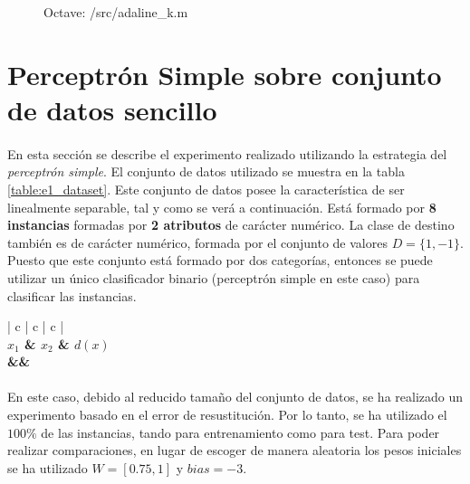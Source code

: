 \documentclass{article}
\begin{document}
			\begin{figure}[h]
				\centering
				\inputminted{octave}{./code/adaline_k.m}
				\caption{Octave: /src/adaline\_k.m}
				\label{code:adaline}
			\end{figure}


	\section{Perceptrón Simple sobre conjunto de datos sencillo}
	\label{sec:e1}

		\paragraph{}
		En esta sección se describe el experimento realizado utilizando la estrategia del \emph{perceptrón simple}. El conjunto de datos utilizado se muestra en la tabla \ref{table:e1_dataset}. Este conjunto de datos posee la característica de ser linealmente separable, tal y como se verá a continuación. Está formado por \textbf{8 instancias} formadas por \textbf{2 atributos} de carácter numérico. La clase de destino también es de carácter numérico, formada por el conjunto de valores $D = \{1,-1\}$. Puesto que este conjunto está formado por dos categorías, entonces se puede utilizar un único clasificador binario (perceptrón simple en este caso) para clasificar las instancias.

		\begin{table}[H]
			\centering
			\begin{tabu}{ | c | c | c |}
				\hline
				 \\ \hline
				\bfseries $x_1$ & \bfseries $x_2$ & \bfseries $d(x)$
				{\\\hline\one&\two&\three}
				\\\hline
			\end{tabu}
			\caption{Conjunto de datos Simple}
			\label{table:e1_dataset}
		\end{table}

		\paragraph{}
		En este caso, debido al reducido tamaño del conjunto de datos, se ha realizado un experimento basado en el error de resustitución. Por lo tanto, se ha utilizado el $100\%$ de las instancias, tando para entrenamiento como para test. Para poder realizar comparaciones, en lugar de escoger de manera aleatoria los pesos iniciales se ha utilizado $W = [0.75,1]$ y $bias = -3$.
\end{document}
